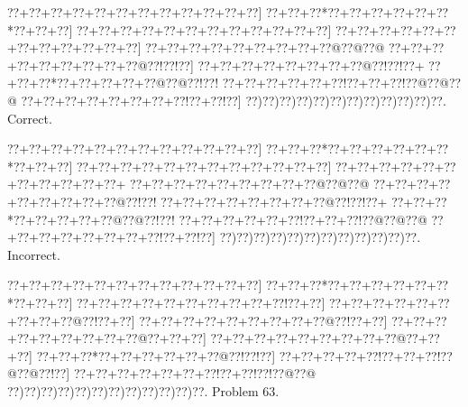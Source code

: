 \documentclass[a5paper]{article}
\begin{document}
\begin{center}
{\goo
\0??+\0??+\0??+\0??+\0??+\0??+\0??+\0??+\0??+\0??+\0??+\0??]
\0??+\0??+\0??*\0??+\0??+\0??+\0??+\0??+\0??*\0??+\0??+\0??]
\0??+\0??+\0??+\0??+\0??+\0??+\0??+\0??+\0??+\0??+\0??+\0??]
\0??+\0??+\0??+\0??+\0??+\0??+\0??+\0??+\0??+\0??+\0??+\0??]
\0??+\0??+\0??+\0??+\0??+\0??+\0??+\0??+\0??@\0??@\0??@
\0??+\0??+\0??+\0??+\0??+\0??+\0??+\0??+\0??@\0??!\0??!\0??]
\0??+\0??+\0??+\0??+\0??+\0??+\0??+\0??@\0??!\0??!\0??+
\0??+\0??+\0??*\0??+\0??+\0??+\0??+\0??@\0??@\0??!\0??!
\0??+\0??+\0??+\0??+\0??+\0??!\0??+\0??+\0??!\0??@\0??@\0??@
\0??+\0??+\0??+\0??+\0??+\0??+\0??+\0??!\0??+\0??!\0??]
\0??)\0??)\0??)\0??)\0??)\0??)\0??)\0??)\0??)\0??)\0??)\0??.
}
Correct. 

\end{center}
\begin{center}
{\goo
\0??+\0??+\0??+\0??+\0??+\0??+\0??+\0??+\0??+\0??+\0??+\0??]
\0??+\0??+\0??*\0??+\0??+\0??+\0??+\0??+\0??*\0??+\0??+\0??]
\0??+\0??+\0??+\0??+\0??+\0??+\0??+\0??+\0??+\0??+\0??+\0??]
\0??+\0??+\0??+\0??+\0??+\0??+\0??+\0??+\0??+\0??+\0??+
\0??+\0??+\0??+\0??+\0??+\0??+\0??+\0??+\0??@\0??@\0??@
\0??+\0??+\0??+\0??+\0??+\0??+\0??+\0??+\0??@\0??!\0??!
\0??+\0??+\0??+\0??+\0??+\0??+\0??+\0??@\0??!\0??!\0??+
\0??+\0??+\0??*\0??+\0??+\0??+\0??+\0??@\0??@\0??!\0??!
\0??+\0??+\0??+\0??+\0??+\0??!\0??+\0??+\0??!\0??@\0??@\0??@
\0??+\0??+\0??+\0??+\0??+\0??+\0??+\0??!\0??+\0??!\0??]
\0??)\0??)\0??)\0??)\0??)\0??)\0??)\0??)\0??)\0??)\0??)\0??.
}
Incorrect. 

\end{center}
\newpage
\begin{center}
{\goo
\0??+\0??+\0??+\0??+\0??+\0??+\0??+\0??+\0??+\0??+\0??+\0??]
\0??+\0??+\0??*\0??+\0??+\0??+\0??+\0??+\0??*\0??+\0??+\0??]
\0??+\0??+\0??+\0??+\0??+\0??+\0??+\0??+\0??+\0??!\0??+\0??]
\0??+\0??+\0??+\0??+\0??+\0??+\0??+\0??+\0??@\0??!\0??+\0??]
\0??+\0??+\0??+\0??+\0??+\0??+\0??+\0??+\0??@\0??!\0??+\0??]
\0??+\0??+\0??+\0??+\0??+\0??+\0??+\0??+\0??@\0??+\0??+\0??]
\0??+\0??+\0??+\0??+\0??+\0??+\0??+\0??+\0??@\0??+\0??+\0??]
\0??+\0??+\0??*\0??+\0??+\0??+\0??+\0??+\0??@\0??!\0??!\0??]
\0??+\0??+\0??+\0??+\0??!\0??+\0??+\0??!\0??@\0??@\0??!\0??]
\0??+\0??+\0??+\0??+\0??+\0??+\0??!\0??+\0??!\0??!\0??@\0??@
\0??)\0??)\0??)\0??)\0??)\0??)\0??)\0??)\0??)\0??)\0??)\0??.
}
Problem 63.

\end{center}
\end{document}
